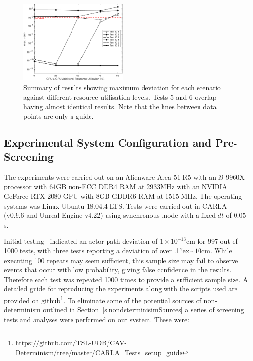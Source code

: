 \documentclass[runningheads,twocolumn,a4paper,10pt]{llncs}
\begin{document}
\begin{figure}[t]
    \centering
    \includegraphics[width=0.48\textwidth]{Other/Figures/ExperimentsStressSummaryV6.pdf}
    \caption{Summary of results showing maximum deviation for each scenario against different resource utilisation levels. Tests 5 and 6 overlap having almost identical results. Note that the lines between data points are only a guide.}
    \label{ExperimentsStressSummary}
\end{figure}
  
\subsection{Experimental System Configuration and Pre-Screening}\label{s:screening}
The experiments were carried out on an Alienware Area 51 R5 with an i9 9960X processor with 64GB non-ECC DDR4 RAM at 2933MHz with an NVIDIA GeForce RTX 2080 GPU with 8GB GDDR6 RAM at 1515 MHz. 
%
The operating systems was Linux Ubuntu 18.04.4 LTS. 
%
Tests were carried out in CARLA (v0.9.6 and Unreal Engine v4.22) using synchronous mode with a fixed $dt$ of $0.05$s. 

Initial testing~\cite{TSLUnrealEngineTesting} indicated an actor path deviation of $1\times10^{-13}$cm for 997 out of 1000 tests, with three tests reporting a deviation of over {\raise.17ex\hbox{$\scriptstyle\sim$}}$10$cm. While executing 100 repeats may seem sufficient, this sample size may fail to observe events that occur with low probability, giving false confidence in the results. 
Therefore each test was repeated 1000 times to provide a sufficient sample size.
%
A detailed guide for reproducing the experiments along with the scripts used are provided on github\footnote{\url{https://github.com/TSL-UOB/CAV-Determinism/tree/master/CARLA_Tests_setup_guide}}.
%
To eliminate some of the potential sources of non-determinism outlined in Section~\ref{s:nondeterminisimSources} a series of screening tests and analyses were performed on our system. These were:
\end{document}
